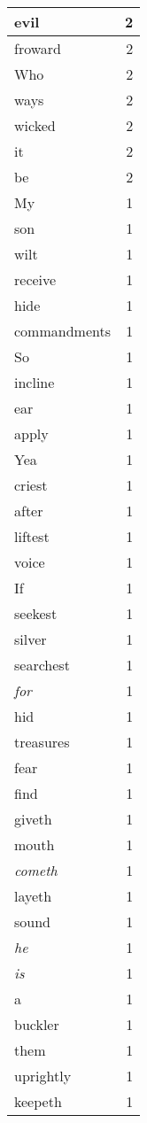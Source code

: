 \begin{center}
\begin{longtable}{l|r}
evil & 2\\ \hline 
froward & 2\\ \hline 
Who & 2\\ \hline 
ways & 2\\ \hline 
wicked & 2\\ \hline 
it & 2\\ \hline 
be & 2\\ \hline 
My & 1\\ \hline 
son & 1\\ \hline 
wilt & 1\\ \hline 
receive & 1\\ \hline 
hide & 1\\ \hline 
commandments & 1\\ \hline 
So & 1\\ \hline 
incline & 1\\ \hline 
ear & 1\\ \hline 
apply & 1\\ \hline 
Yea & 1\\ \hline 
criest & 1\\ \hline 
after & 1\\ \hline 
liftest & 1\\ \hline 
voice & 1\\ \hline 
If & 1\\ \hline 
seekest & 1\\ \hline 
silver & 1\\ \hline 
searchest & 1\\ \hline 
\emph{for} & 1\\ \hline 
hid & 1\\ \hline 
treasures & 1\\ \hline 
fear & 1\\ \hline 
find & 1\\ \hline 
giveth & 1\\ \hline 
mouth & 1\\ \hline 
\emph{cometh} & 1\\ \hline 
layeth & 1\\ \hline 
sound & 1\\ \hline 
\emph{he} & 1\\ \hline 
\emph{is} & 1\\ \hline 
a & 1\\ \hline 
buckler & 1\\ \hline 
them & 1\\ \hline 
uprightly & 1\\ \hline 
keepeth & 1\\ \hline 

\end{longtable}
\end{center}
